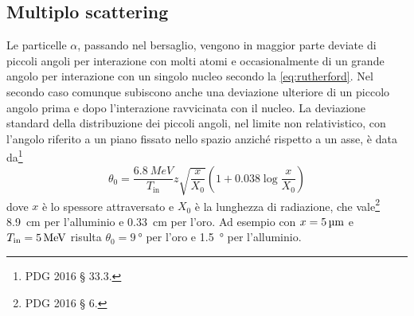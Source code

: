 \subsection{Multiplo scattering}

Le particelle $\alpha$, passando nel bersaglio,
vengono in maggior parte deviate di piccoli angoli per interazione con molti atomi
e occasionalmente di un grande angolo per interazione con un singolo nucleo secondo la \eqref{eq:rutherford}.
Nel secondo caso comunque subiscono anche una deviazione ulteriore di un piccolo angolo
prima e dopo l'interazione ravvicinata con il nucleo.
La deviazione standard della distribuzione dei piccoli angoli,
nel limite non relativistico,
con l'angolo riferito a un piano fissato nello spazio anziché rispetto a un asse,
è data da\footnote{PDG 2016 \S{} 33.3.}
\begin{equation}
	\label{eq:ms}
	\theta_0 = \frac {\SI{6.8}{MeV}} {T_\text{in}} z \sqrt{\frac{x}{X_0}} \left(1+0.038\log\frac x{X_0}\right)
\end{equation}
dove $x$ è lo spessore attraversato e $X_0$ è la lunghezza di radiazione,
che vale\footnote{PDG 2016 \S{} 6.} \SI{8.9}{cm} per l'alluminio e \SI{0.33}{cm} per l'oro.
Ad esempio con $x = \SI5{\micro m}$ e $T_\text{in} = \SI5{MeV}$
risulta $\theta_0 = \SI{9}\degree$ per l'oro e \SI{1.5}{\degree} per l'alluminio.

